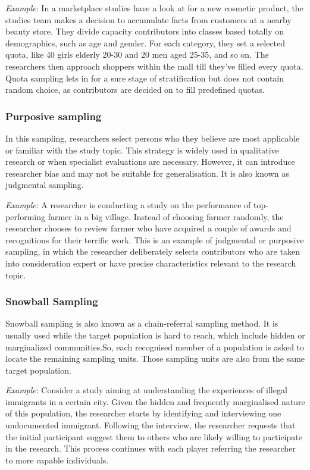 \documentclass[
]{book}
\begin{document}
\emph{Example}: In a marketplace studies have a look at for a new cosmetic product, the studies team makes a decision to accumulate facts from customers at a nearby beauty store. They divide capacity contributors into classes based totally on demographics, such as age and gender. For each category, they set a selected quota, like 40 girls elderly 20-30 and 20 men aged 25-35, and so on. The researchers then approach shoppers within the mall till they've filled every quota. Quota sampling lets in for a sure stage of stratification but does not contain random choice, as contributors are decided on to fill predefined quotas.

\hypertarget{purposive-sampling}{%
\subsubsection{Purposive sampling}\label{purposive-sampling}}

In this sampling, researchers select persons who they believe are most applicable or familiar with the study topic. This strategy is widely used in qualitative research or when specialist evaluations are necessary. However, it can introduce researcher bias and may not be suitable for generalisation. It is also known as judgmental sampling.

\emph{Example}: A researcher is conducting a study on the performance of top-performing farmer in a big village. Instead of choosing farmer randomly, the researcher chooses to review farmer who have acquired a couple of awards and recognitions for their terrific work. This is an example of judgmental or purposive sampling, in which the researcher deliberately selects contributors who are taken into consideration expert or have precise characteristics relevant to the research topic.

\hypertarget{snowball-sampling}{%
\subsubsection{Snowball Sampling}\label{snowball-sampling}}

Snowball sampling is also known as a chain-referral sampling method. It is usually used while the target population is hard to reach, which include hidden or marginalized communities.So, each recognised member of a population is asked to locate the remaining sampling units. Those sampling units are also from the same target population.

\emph{Example}: Consider a study aiming at understanding the experiences of illegal immigrants in a certain city. Given the hidden and frequently marginalised nature of this population, the researcher starts by identifying and interviewing one undocumented immigrant. Following the interview, the researcher requests that the initial participant suggest them to others who are likely willing to participate in the research. This process continues with each player referring the researcher to more capable individuals.
\end{document}
